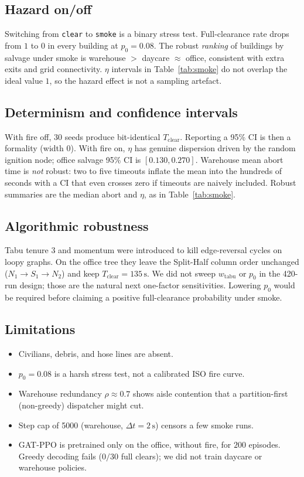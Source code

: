 \documentclass[12pt]{article}
\newcommand{\Tclear}{T_{\mathrm{clear}}}
\begin{document}
\subsection{Hazard on/off}

Switching from \texttt{clear} to \texttt{smoke} is a binary stress test. Full-clearance
rate drops from \(1\) to \(0\) in every building at \(p_0=0.08\). The robust
\emph{ranking} of buildings by salvage under smoke is warehouse \(>\) daycare
\(\approx\) office, consistent with extra exits and grid connectivity. \(\eta\)
intervals in Table~\ref{tab:smoke} do not overlap the ideal value \(1\), so the
hazard effect is not a sampling artefact.

\subsection{Determinism and confidence intervals}

With fire off, 30 seeds produce bit-identical \(\Tclear\). Reporting a 95\% CI
is then a formality (width \(0\)). With fire on, \(\eta\) has genuine dispersion
driven by the random ignition node; office salvage 95\% CI is
\([0.130,0.270]\). Warehouse mean abort time is \emph{not} robust: two to five
timeouts inflate the mean into the hundreds of seconds with a CI that even
crosses zero if timeouts are naively included. Robust summaries are the median
abort and \(\eta\), as in Table~\ref{tab:smoke}.

\subsection{Algorithmic robustness}

Tabu tenure \(3\) and momentum were introduced to kill edge-reversal cycles on
loopy graphs. On the office tree they leave the Split-Half column order unchanged
(\(N_1\to S_1\to N_2\)) and keep \(\Tclear=135\,\mathrm{s}\). We did not sweep
\(w_{\mathrm{tabu}}\) or \(p_0\) in the 420-run design; those are the natural next
one-factor sensitivities. Lowering \(p_0\) would be required before claiming a
positive full-clearance probability under smoke.

\subsection{Limitations}
\begin{itemize}[leftmargin=1.2em]
  \item Civilians, debris, and hose lines are absent.
  \item \(p_0=0.08\) is a harsh stress test, not a calibrated ISO fire curve.
  \item Warehouse redundancy \(\rho\approx 0.7\) shows aisle contention that a
        partition-first (non-greedy) dispatcher might cut.
  \item Step cap of 5000 (warehouse, \(\Delta t=2\,\mathrm{s}\)) censors a few smoke
        runs.
  \item GAT-PPO is pretrained only on the office, without fire, for \(200\)
        episodes. Greedy decoding fails (\(0/30\) full clears); we did not train
        daycare or warehouse policies.
\end{itemize}
\end{document}
